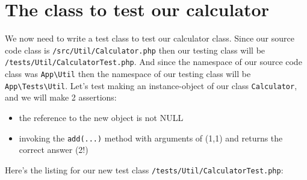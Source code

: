\documentclass[a4paperpaper,openright]{book}
\begin{document}
\hypertarget{the-class-to-test-our-calculator}{%
\section{The class to test our
calculator}\label{the-class-to-test-our-calculator}}

We now need to write a test class to test our calculator class. Since
our source code class is \texttt{/src/Util/Calculator.php} then our
testing class will be \texttt{/tests/Util/CalculatorTest.php}. And since
the namespace of our source code class was
\texttt{App\textbackslash{}Util} then the namespace of our testing class
will be \texttt{App\textbackslash{}Tests\textbackslash{}Util}. Let's
test making an instance-object of our class \texttt{Calculator}, and we
will make 2 assertions:

\begin{itemize}
\item
  the reference to the new object is not NULL
\item
  invoking the \texttt{add(...)} method with arguments of (1,1) and
  returns the correct answer (2!)
\end{itemize}

Here's the listing for our new test class
\texttt{/tests/Util/CalculatorTest.php}:
\end{document}
